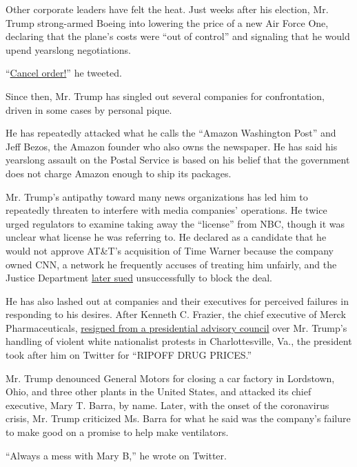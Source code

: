Other corporate leaders have felt the heat. Just weeks after his
election, Mr. Trump strong-armed Boeing into lowering the price of a new
Air Force One, declaring that the plane's costs were ``out of control''
and signaling that he would upend yearslong negotiations.

``\href{https://www.nytimes3xbfgragh.onion/2016/12/06/us/politics/trump-air-force-one-boeing.html}{Cancel
order!}'' he tweeted.

Since then, Mr. Trump has singled out several companies for
confrontation, driven in some cases by personal pique.

He has repeatedly attacked what he calls the ``Amazon Washington Post''
and Jeff Bezos, the Amazon founder who also owns the newspaper. He has
said his yearslong assault on the Postal Service is based on his belief
that the government does not charge Amazon enough to ship its packages.

Mr. Trump's antipathy toward many news organizations has led him to
repeatedly threaten to interfere with media companies' operations. He
twice urged regulators to examine taking away the ``license'' from NBC,
though it was unclear what license he was referring to. He declared as a
candidate that he would not approve AT\&T's acquisition of Time Warner
because the company owned CNN, a network he frequently accuses of
treating him unfairly, and the Justice Department
\href{https://www.nytimes3xbfgragh.onion/2017/11/20/business/dealbook/att-time-warner-merger.html}{later
sued} unsuccessfully to block the deal.

He has also lashed out at companies and their executives for perceived
failures in responding to his desires. After Kenneth C. Frazier, the
chief executive of Merck Pharmaceuticals,
\href{https://www.nytimes3xbfgragh.onion/2017/08/14/business/merck-trump-ceos.html}{resigned
from a presidential advisory council} over Mr. Trump's handling of
violent white nationalist protests in Charlottesville, Va., the
president took after him on Twitter for ``RIPOFF DRUG PRICES.''

Mr. Trump denounced General Motors for closing a car factory in
Lordstown, Ohio, and three other plants in the United States, and
attacked its chief executive, Mary T. Barra, by name. Later, with the
onset of the coronavirus crisis, Mr. Trump criticized Ms. Barra for what
he said was the company's failure to make good on a promise to help make
ventilators.

``Always a mess with Mary B,'' he wrote on Twitter.

